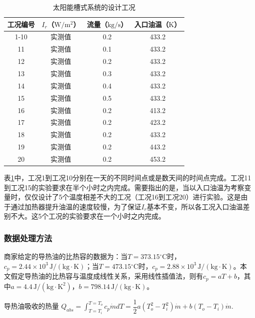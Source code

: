 \begin{table}[htbp]\footnotesize
\setlength{\abovecaptionskip}{-10pt}
	\caption{太阳能槽式系统的设计工况}
	\begin{center}
	\begin{tabular}{cccc}
		\toprule
		工况编号	& $I_r$（$\mathrm{W/m^2}$）&	流量（$\mathrm{kg/s}$）			&	入口油温（$\mathrm{K}$）\\
		\midrule
		1-10	&	实测值	&	0.2	&	433.2\\
		11	&	实测值	&	0.1	&	433.2\\
		12	&	实测值	&	0.2	&	433.2\\
		13	&	实测值	&	0.3	&	433.2\\
		14	&	实测值	&	0.4	&	433.2\\
		15	&	实测值	&	0.5	&	433.2\\
		16	&	实测值	&	0.2	&	413.2\\
		17	&	实测值	&	0.2	&	423.2\\
		18	&	实测值	&	0.2	&	433.2\\
		19	&	实测值	&	0.2	&	443.2\\
		20	&	实测值	&	0.2	&	453.2\\
		\bottomrule
	\end{tabular}
	\end{center}
	\label{tab:DesignedCasesForTrough}
\end{table}

表\ref{tab:DesignedCasesForTrough}中，工况1到工况10分别在一天的不同时间点或是数天间的时间点完成。工况11到工况15的实验要求在半个小时之内完成。需要指出的是，当以入口油温为考察变量时，仅仅设计了5个温度相差不大的工况（工况16到工况20）进行实验。这是由于通过加热器提升油温的速度较慢，为了保证$I_r$基本不变，所以各工况入口油温差别不大。这5个工况的实验要求在一个小时之内完成。

\subsubsection{数据处理方法}
商家给定的导热油的比热容的数据为：当$T = 373.15\mathrm{^\circ C}$时，$c_p = 2.44\times10^3\,\mathrm{J/(kg\cdot K)}$；当$T = 473.15\mathrm{^\circ C}$时，$c_p = 2.88\times10^3\,\mathrm{J/(kg\cdot K)}$。本文假定导热油的比热容与温度成线性关系，采用线性插值法，则有$c_p = aT + b$，其中$a = 4.4\,\mathrm{J/(kg \cdot K^2)}$，$b = 798.14\,\mathrm{J/(kg\cdot K)}$。

导热油吸收的热量 $Q_{abs} = \int_{T=T_i}^{T = T_o}c_p\dot{m}dT = \dfrac{1}{2}a(T_o^2 - T_i^2)\dot{m} + b (T_o - T_i)\dot{m}$.

